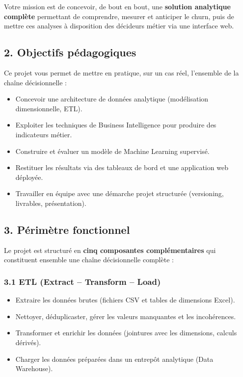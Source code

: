 \documentclass[11pt,a4paper]{article}
\providecommand{\tightlist}{\setlength{\itemsep}{0pt}\setlength{\parskip}{0pt}}
\begin{document}
Votre mission est de concevoir, de bout en bout, une \textbf{solution
analytique complète} permettant de comprendre, mesurer et anticiper le
churn, puis de mettre ces analyses à disposition des décideurs métier
via une interface web.

\subsection{2. Objectifs pédagogiques}\label{objectifs-puxe9dagogiques}

Ce projet vous permet de mettre en pratique, sur un cas réel, l'ensemble
de la chaîne décisionnelle :

\begin{itemize}
\tightlist
\item
  Concevoir une architecture de données analytique (modélisation
  dimensionnelle, ETL).
\item
  Exploiter les techniques de Business Intelligence pour produire des
  indicateurs métier.
\item
  Construire et évaluer un modèle de Machine Learning supervisé.
\item
  Restituer les résultats via des tableaux de bord et une application
  web déployée.
\item
  Travailler en équipe avec une démarche projet structurée (versioning,
  livrables, présentation).
\end{itemize}

\subsection{3. Périmètre fonctionnel}\label{puxe9rimuxe8tre-fonctionnel}

Le projet est structuré en \textbf{cinq composantes complémentaires} qui
constituent ensemble une chaîne décisionnelle complète :

\subsubsection{3.1 ETL (Extract -- Transform --
Load)}\label{etl-extract-transform-load}

\begin{itemize}
\tightlist
\item
  Extraire les données brutes (fichiers CSV et tables de dimensions
  Excel).
\item
  Nettoyer, déduplicaster, gérer les valeurs manquantes et les
  incohérences.
\item
  Transformer et enrichir les données (jointures avec les dimensions,
  calculs dérivés).
\item
  Charger les données préparées dans un entrepôt analytique (Data
  Warehouse).
\end{itemize}
\end{document}
